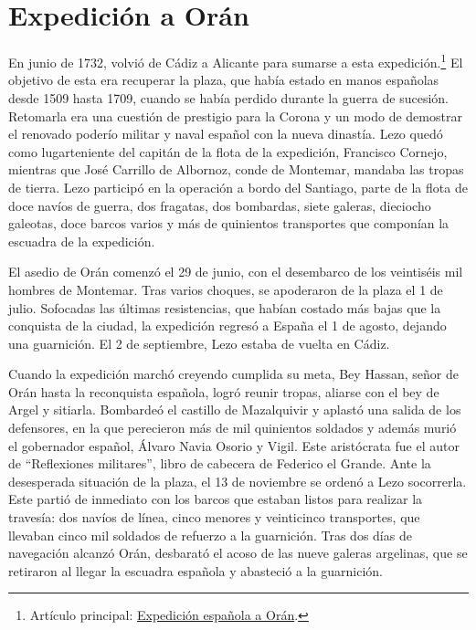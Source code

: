 \section{Expedición a Orán}

En junio de 1732, volvió de Cádiz a Alicante para sumarse a esta
expedición.\footnote{Artículo principal:
  \href{https://is.gd/wPfH3B}{Expedición española a Orán}.} El objetivo
de esta era recuperar la plaza, que había estado en manos españolas
desde 1509 hasta 1709, cuando se había perdido durante la guerra de
sucesión. Retomarla era una cuestión de prestigio para la Corona y
un modo de demostrar el renovado poderío militar y naval español con
la nueva dinastía. Lezo quedó como lugarteniente del capitán de la
flota de la expedición, Francisco Cornejo, mientras que José Carrillo
de Albornoz, conde de Montemar, mandaba las tropas de tierra. Lezo
participó en la operación a bordo del Santiago, parte de la flota de
doce navíos de guerra, dos fragatas, dos bombardas, siete galeras,
dieciocho galeotas, doce barcos varios y más de quinientos transportes
que componían la escuadra de la expedición.

El asedio de Orán comenzó el 29 de junio, con el desembarco de los
veintiséis mil hombres de Montemar. Tras varios choques, se apoderaron
de la plaza el 1 de julio. Sofocadas las últimas resistencias, que
habían costado más bajas que la conquista de la ciudad, la expedición
regresó a España el 1 de agosto, dejando una guarnición. El 2 de
septiembre, Lezo estaba de vuelta en Cádiz.

Cuando la expedición marchó creyendo cumplida su meta, Bey Hassan,
señor de Orán hasta la reconquista española, logró reunir tropas,
aliarse con el bey de Argel y sitiarla. Bombardeó el castillo de
Mazalquivir y aplastó una salida de los defensores, en la que
perecieron más de mil quinientos soldados y además murió el gobernador
español, Álvaro Navia Osorio y Vigil. Este aristócrata fue el autor de
``Reflexiones militares'', libro de cabecera de Federico el Grande.
Ante la desesperada situación de la plaza, el 13 de noviembre se
ordenó a Lezo socorrerla. Este partió de inmediato con los barcos
que estaban listos para realizar la travesía: dos navíos de línea,
cinco menores y veinticinco transportes, que llevaban cinco mil
soldados de refuerzo a la guarnición. Tras dos días de navegación
alcanzó Orán, desbarató el acoso de las nueve galeras argelinas, que
se retiraron al llegar la escuadra española y abasteció a la
guarnición.

